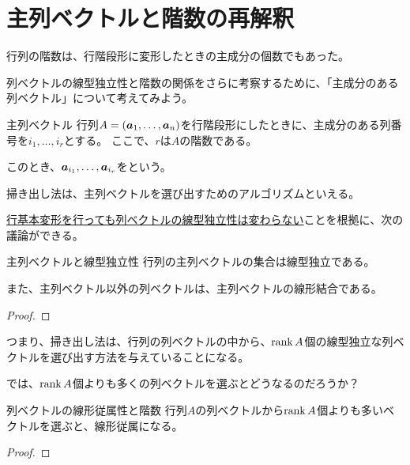 \documentclass[../../../topic_linear-algebra]{subfiles}
\begin{document}
\sectionline
\section{主列ベクトルと階数の再解釈}

行列の階数は、行階段形に変形したときの主成分の個数でもあった。

列ベクトルの線型独立性と階数の関係をさらに考察するために、「主成分のある列ベクトル」について考えてみよう。

\begin{definition}{主列ベクトル}\label{def:pivot-columns}
  行列$A = (\vb*{a}_1, \dots, \vb*{a}_n)$を行階段形にしたときに、主成分のある列番号を$i_1,\dots, i_r$とする。
  ここで、$r$は$A$の階数である。

  このとき、$\vb*{a}_{i_1}, \dots, \vb*{a}_{i_r}$をという。
\end{definition}

掃き出し法は、主列ベクトルを選び出すためのアルゴリズムといえる。

\br

\hyperref[thm:row-operation-preserves-dependence]{行基本変形を行っても列ベクトルの線型独立性は変わらない}ことを根拠に、次の議論ができる。

\begin{theorem*}{主列ベクトルと線型独立性}
  行列の主列ベクトルの集合は線型独立である。

  また、主列ベクトル以外の列ベクトルは、主列ベクトルの線形結合である。
\end{theorem*}

\begin{proof}
\end{proof}

\br

つまり、掃き出し法は、行列の列ベクトルの中から、$\rank A$個の線型独立な列ベクトルを選び出す方法を与えていることになる。

\br

では、$\rank A$個よりも多くの列ベクトルを選ぶとどうなるのだろうか？

\begin{theorem*}{列ベクトルの線形従属性と階数}
  行列$A$の列ベクトルから$\rank A$個よりも多いベクトルを選ぶと、線形従属になる。
\end{theorem*}

\begin{proof}
\end{proof}
\end{document}
